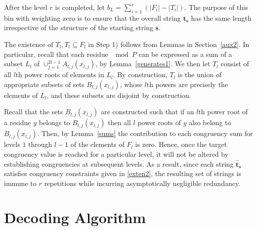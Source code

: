 After the level $r$ is completed, let $b_L=\sum_{i=1}^r (|F_i|-
|T_i|)$. The purpose of this bin with weighting zero is to ensure
that the overall string $\mathbf{t_s}$ has the same length
irrespective of the structure of the starting string $\mathbf{s}$.

The existence of $T_l, T_l \subseteq F_l$ in Step 1) follows from
Lemmas in Section~\ref{aux2}. In particular, recall that each
residue $\mod P$ can be expressed as a sum of a subset $L_{l}$ of
$\cup_{j=1}^{2l-1} A_{l,j}(x_{l,j})$, by Lemma~\ref{generates1}. We
then let $T_l$ consist of all $l$th power roots of elements in
$L_l$. By construction, $T_l$ is the union of appropriate subsets of
sets $B_{l,j}(x_{l,j})$, whose $l$th powers are precisely the
elements of $L_l$, and these subsets are disjoint by construction.





Recall that the sets $B_{l,j}(x_{l,j})$ are constructed such that if
an $l$th power root of a residue $y$ belongs to $B_{l,j}(x_{l,j})$
then all $l$ power roots of $y$ also belong to $B_{l,j}(x_{l,j})$.
Then, by Lemma~\ref{sums} the contribution to each congruency sum
for levels $1$ through $l-1$ of the elements of $F_l$ is zero.
Hence, once the target congruency value is reached for a particular
level, it will not be altered by establishing congruencies at
subsequent levels. As a result, since each string
$\tilde{\mathbf{t_s}}$ satisfies congruency constraints given in
\eqref{exten2},  the resulting set of strings is immune to $r$
repetitions while incurring asymptotically negligible redundancy.



\section{Decoding Algorithm}\label{dec}



